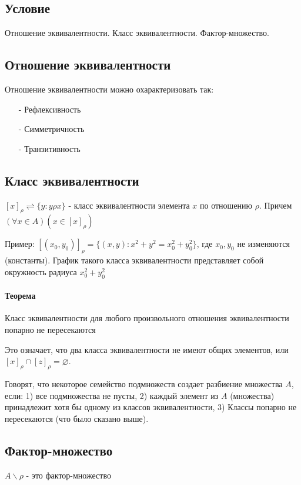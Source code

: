 \documentclass{report}
\begin{document}
\subsection{Условие}
Отношение эквивалентности. Класс эквивалентности. Фактор-множество.

\subsection{Отношение эквивалентности}
Отношение эквивалентности можно охарактеризовать так:
\begin{itemize}
	\item[-] Рефлексивность
	\item[-] Симметричность
	\item[-] Транзитивность
\end{itemize}

\subsection{Класс эквивалентности}
$[x]_{\rho} \rightleftharpoons \{y: y\rho x\}$ - класс эквивалентности элемента $x$ по отношению $\rho$.
Причем $(\forall x \in A)(x \in [x]_{\rho})$

Пример: $[(x_{0},y_{0})]_{\rho} = \{(x,y): x^{2} + y^{2} = x_{0}^{2} + y_{0}^{2}\}$, где $x_{0}, y_{0}$ не изменяются (константы).
График такого класса эквивалентности представляет собой окружность радиуса $x_{0}^{2} + y_{0}^{2}$

\paragraph{Теорема}
Класс эквивалентности для любого произвольного отношения эквивалентности попарно не пересекаются

\medskip

Это означает, что два класса эквивалентности не имеют общих элементов, или
$[x]_{\rho} \cap [z]_{\rho} = \varnothing$.

Говорят, что некоторое семейство подмножеств создает разбиение множества $A$, если:
1) все подмножества не пусты,
2) каждый элемент из $A$ (множества) принадлежит хотя бы одному из классов эквивалентности,
3) Классы попарно не пересекаются (что было сказано выше).

\subsection{Фактор-множество}
$A\backslash\rho$ - это фактор-множество
\end{document}
